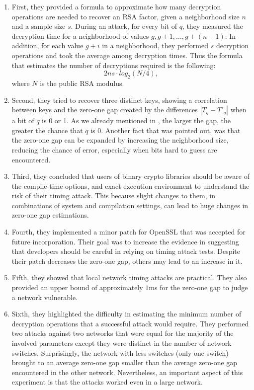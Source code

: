 \begin{enumerate}

  \item First, they provided a formula to approximate how many decryption operations are needed to recover an RSA factor, given a neighborhood size $n$ and a sample size $s$.
During an attack, for every bit of $q$, they measured the decryption time for a neighborhood of values $g, g + 1, \dots, g + (n - 1)$. In addition, for each value $g + i$ in a neighborhood, they performed $s$ decryption operations and took the average among decryption times. Thus the formula that estimates the number of decryptions required is the following: $$ 2ns \cdot log_2 \left( N/4 \right), $$
where $N$ is the public RSA modulus.

  \item Second, they tried to recover three distinct keys, showing a correlation between keys and the zero-one gap created by the differences $|T_g - T'_g|$ when a bit of $q$ is 0 or 1. As we already mentioned in , the larger the gap, the greater the chance that $q$ is $0$. Another fact that was pointed out, was that the zero-one gap can be expanded by increasing the neighborhood size, reducing the chance of error, especially when bits hard to guess are encountered.

  \item Third, they concluded that users of binary crypto libraries should be aware of the compile-time options, and exact execution environment to understand the risk of their timing attack. This because slight changes to them, in combinations of system and compilation settings, can lead to huge changes in zero-one gap estimations.

  \item Fourth, they implemented a minor patch for OpenSSL that was accepted for future incorporation. Their goal was to increase the evidence in suggesting that developers should be careful in relying on timing attack tests. Despite their patch decreases the zero-one gap, others may lead to an increase in it.

  \item Fifth, they showed that local network timing attacks are practical. They also provided an upper bound of approximately $1$ms for the zero-one gap to judge a network vulnerable.

  \item Sixth, they highlighted the difficulty in estimating the minimum number of decryption operations that a successful attack would require. They performed two attacks against two networks that were equal for the majority of the involved parameters except they were distinct in the number of network switches. Surprisingly, the network with less switches (only one switch) brought to an average zero-one gap smaller than the average zero-one gap encountered in the other network. Nevertheless, an important aspect of this experiment is that the attacks worked even in a large network.

\end{enumerate}


